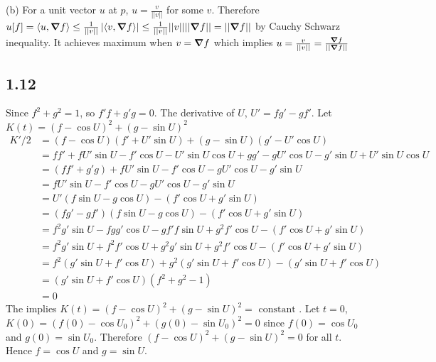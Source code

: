 \documentclass[12pt]{article}
\begin{document}
(b) For a unit vector $u$ at $p$, $u= \frac{v}{||v||}$ for some $v$. Therefore $u[f] = \langle u, \grad f \rangle \leq  \frac{1}{||v||}\left|\langle v, \grad f \rangle \right| \leq \frac{1}{||v||}||v|| ||\grad f|| = ||\grad f||$ by Cauchy Schwarz inequality. It achieves maximum when $v = \grad f $ which implies $u = \frac{v}{||v||} = \frac{\grad f}{||\grad f||}$

\subsection*{1.12}
Since $f^2 + g^2 = 1$, so $f'f + g'g = 0$. The derivative of $U$, $U'= fg' - gf'$.
Let $K(t) = (f - \cos U)^2 + (g - \sin U)^2$
$$
\begin{aligned}
	K'/2 &= (f - \cos U)(f' + U' \sin U ) + (g - \sin U) (g' -  U' \cos U) \\
	&=ff'+ fU'\sin U - f' \cos U -U' \sin U \cos U + gg' - gU'\cos U - g'\sin U + U'\sin U \cos U \\ 
	&=(ff'+g'g) + fU'\sin U - f' \cos U - gU'\cos U - g'\sin U \\
	&=  fU'\sin U - f' \cos U - gU'\cos U - g'\sin U \\
	&= U'(f \sin U - g \cos U) - (f' \cos U + g'\sin U) \\
	&= (fg' - gf')(f \sin U - g \cos U) - (f' \cos U + g'\sin U) \\
	&= f^2g'\sin U - fgg' \cos U - gf'f \sin U + g^2f' \cos U  - (f' \cos U + g'\sin U) \\
	&= f^2g'\sin U + f^2f' \cos U + g^2 g' \sin U + g^2 f' \cos U  - (f' \cos U + g'\sin U) \\
	&= f^2 (g'\sin U + f' \cos U) + g^2 (g' \sin U + f' \cos U ) - ( g'\sin U + f' \cos U) \\
	&=(g'\sin U + f' \cos U)(f^2 + g^2 - 1)\\
	&= 0
\end{aligned}
$$
The implies $K(t) = (f - \cos U)^2 + (g - \sin U)^2 = \mbox{ constant }$. Let $t=0$, $K(0) = (f(0) - \cos U_0)^2 + (g(0) - \sin U_0)^2 = 0$ since $f(0) = \cos U_0$ and $g(0) = \sin U_0$. Therefore $ (f - \cos U)^2 + (g - \sin U)^2  = 0$ for all $t$. Hence $f = \cos U$ and $g = \sin U$.\QED
\end{document}

